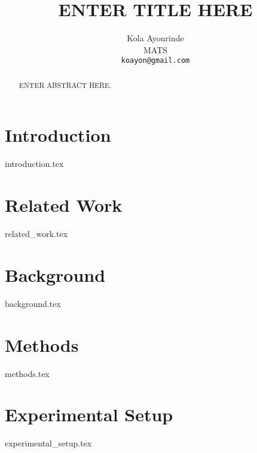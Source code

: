 \documentclass{article} %
\title{ENTER TITLE HERE}
\author{{\hspace{1mm}Kola Ayonrinde} \\
        MATS \\
	\texttt{koayon@gmail.com} \\
}
\begin{document}
\maketitle

\begin{abstract}
ENTER ABSTRACT HERE.
\end{abstract}





\section{Introduction}
\label{sec:intro}
{introduction.tex}

\section{Related Work}
\label{sec:related_work}
{related_work.tex}

\section{Background}
\label{sec:background}
{background.tex}

\section{Methods}
\label{sec:methods}
{methods.tex}

\hypertarget{setup}{%
\section{Experimental Setup}\label{setup}}
{experimental_setup.tex}
\end{document}

